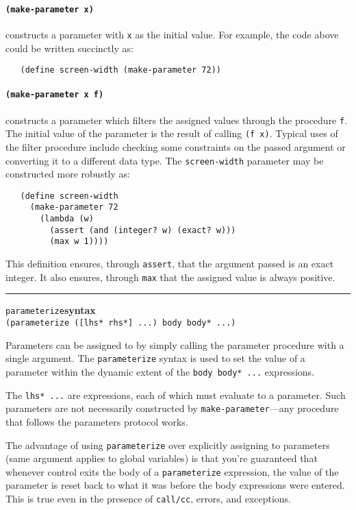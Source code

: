 \documentclass[onecolumn, 12pt, twoside, openright, dvipdfm]{book}
\makeatletter
\newcommand{\idxlabeldefun}[5]{
\vspace{1ex}
\rule{\textwidth}{2pt}
{\phantomsection\index{#1@\texttt{#2}}\label{#3}{\Large\texttt{#4}}\hfill\textbf{#5}}\\}
\newcommand{\idxdefun}[3]{\idxlabeldefun{#1}{#2}{#1}{#2}{#3}}
\newcommand{\defun}[2]{\idxdefun{#1}{#1}{#2}}
\makeatother
\begin{document}
\paragraph{\texttt{(make-parameter x)}} constructs a parameter
with \texttt{x} as the initial value.  For example, the code above
could be written succinctly as:
\begin{verbatim}
   (define screen-width (make-parameter 72))
\end{verbatim}

\paragraph{\texttt{(make-parameter x f)}} constructs a parameter
which filters the assigned values through the procedure \texttt{f}.
The initial value of the parameter is the result of calling
\texttt{(f~x)}.  Typical uses of the filter procedure include
checking some constraints on the passed argument or converting it to
a different data type.  The \texttt{screen-width} parameter may be
constructed more robustly as:
\begin{verbatim}
   (define screen-width 
     (make-parameter 72
       (lambda (w)
         (assert (and (integer? w) (exact? w)))
         (max w 1))))
\end{verbatim}
This definition ensures, through \texttt{assert}, that the argument
passed is an exact integer.  It also ensures, through \texttt{max}
that the assigned value is always positive.


\defun{parameterize}{syntax}
\texttt{(parameterize ([lhs* rhs*] ...) body body* ...)}

Parameters can be assigned to by simply calling the parameter
procedure with a single argument.  The \texttt{parameterize} syntax
is used to set the value of a parameter within the dynamic extent of
the \texttt{body~body*~...} expressions.  

The \texttt{lhs* ...} are expressions, each of which must evaluate
to a parameter.  Such parameters are not necessarily constructed by
\texttt{make-parameter}---any procedure that follows the parameters
protocol works.  

The advantage of using \texttt{parameterize} over explicitly
assigning to parameters (same argument applies to global variables)
is that you're guaranteed that whenever control exits the body of a
\texttt{parameterize} expression, the value of the parameter is
reset back to what it was before the body expressions were entered.
This is true even in the presence of \texttt{call/cc}, errors, and
exceptions.
\end{document}
